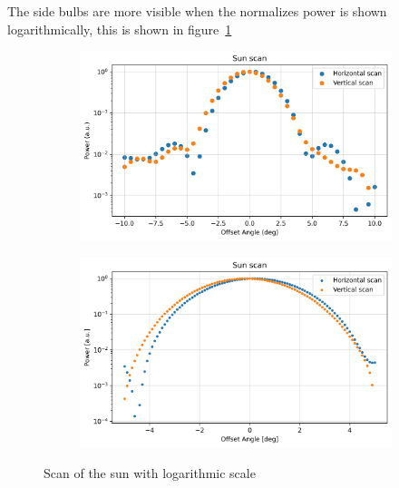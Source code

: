The side bulbs are more visible when the normalizes power is shown logarithmically, this is shown in figure~\ref{fig:sun_scan_log}
\begin{figure}[H]
    \centering
    \begin{subfigure}[t]{0.45\linewidth}
        \includegraphics[width=\linewidth]{assets/sun_scan_low_res_log.png}
    \end{subfigure}
    \begin{subfigure}[t]{0.45\linewidth}
        \includegraphics[width=\linewidth]{assets/sun_scan_high_res_log.png}
    \end{subfigure}
    \caption{Scan of the sun with logarithmic scale}
    \label{fig:sun_scan_log}
\end{figure}

